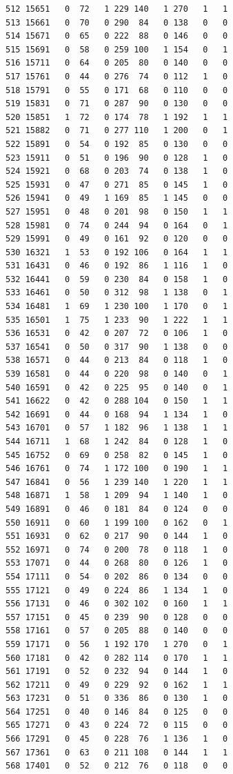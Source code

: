 \documentclass[
  letterpaper,
  DIV=11,
  numbers=noendperiod]{scrreprt}
\begin{document}
\begin{verbatim}
512 15651   0  72   1 229 140   1 270   1   1
513 15661   0  70   0 290  84   0 138   0   0
514 15671   0  65   0 222  88   0 146   0   0
515 15691   0  58   0 259 100   1 154   0   1
516 15711   0  64   0 205  80   0 140   0   0
517 15761   0  44   0 276  74   0 112   1   0
518 15791   0  55   0 171  68   0 110   0   0
519 15831   0  71   0 287  90   0 130   0   0
520 15851   1  72   0 174  78   1 192   1   1
521 15882   0  71   0 277 110   1 200   0   1
522 15891   0  54   0 192  85   0 130   0   0
523 15911   0  51   0 196  90   0 128   1   0
524 15921   0  68   0 203  74   0 138   1   0
525 15931   0  47   0 271  85   0 145   1   0
526 15941   0  49   1 169  85   1 145   0   0
527 15951   0  48   0 201  98   0 150   1   1
528 15981   0  74   0 244  94   0 164   0   1
529 15991   0  49   0 161  92   0 120   0   0
530 16321   1  53   0 192 106   0 164   1   1
531 16431   0  46   0 192  86   1 116   1   0
532 16441   0  59   0 230  84   0 158   1   0
533 16461   0  50   0 312  98   1 138   0   1
534 16481   1  69   1 230 100   1 170   0   1
535 16501   1  75   1 233  90   1 222   1   1
536 16531   0  42   0 207  72   0 106   1   0
537 16541   0  50   0 317  90   1 138   0   0
538 16571   0  44   0 213  84   0 118   1   0
539 16581   0  44   0 220  98   0 140   0   1
540 16591   0  42   0 225  95   0 140   0   1
541 16622   0  42   0 288 104   0 150   1   1
542 16691   0  44   0 168  94   1 134   1   0
543 16701   0  57   1 182  96   1 138   1   1
544 16711   1  68   1 242  84   0 128   1   0
545 16752   0  69   0 258  82   0 145   1   0
546 16761   0  74   1 172 100   0 190   1   1
547 16841   0  56   1 239 140   1 220   1   1
548 16871   1  58   1 209  94   1 140   1   0
549 16891   0  46   0 181  84   0 124   0   0
550 16911   0  60   1 199 100   0 162   0   1
551 16931   0  62   0 217  90   0 144   1   0
552 16971   0  74   0 200  78   0 118   1   0
553 17071   0  44   0 268  80   0 126   1   0
554 17111   0  54   0 202  86   0 134   0   0
555 17121   0  49   0 224  86   1 134   1   0
556 17131   0  46   0 302 102   0 160   1   1
557 17151   0  45   0 239  90   0 128   0   0
558 17161   0  57   0 205  88   0 140   0   0
559 17171   0  56   1 192 170   1 270   0   1
560 17181   0  42   0 282 114   0 170   1   1
561 17191   0  52   0 232  94   0 144   1   0
562 17211   0  49   0 229  92   0 162   1   1
563 17231   0  51   0 336  86   0 130   1   0
564 17251   0  40   0 146  84   0 125   0   0
565 17271   0  43   0 224  72   0 115   0   0
566 17291   0  45   0 228  76   1 136   1   0
567 17361   0  63   0 211 108   0 144   1   1
568 17401   0  52   0 212  76   0 118   0   0

\end{verbatim}
\end{document}
